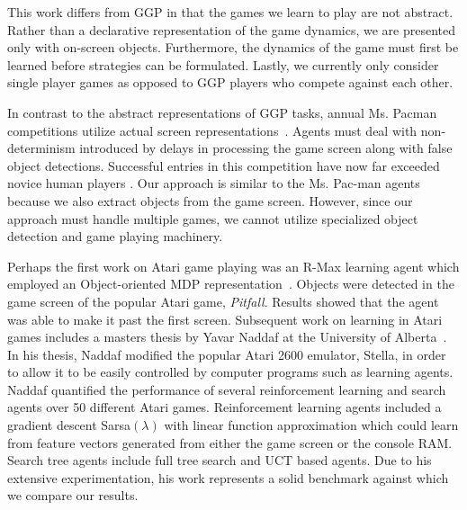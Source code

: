 \documentclass{acm_proc_article-sp}
\begin{document}
This work differs from GGP in that the games we learn to play are not abstract. Rather than a declarative representation of the game dynamics, we are presented only with on-screen objects. Furthermore, the dynamics of the game must first be learned before strategies can be formulated. Lastly, we currently only consider single player games as opposed to GGP players who compete against each other.

In contrast to the abstract representations of GGP tasks, annual Ms. Pacman competitions utilize actual screen representations~\cite{pacmancompetition}. Agents must deal with non-determinism introduced by delays in processing the game screen along with false object detections. Successful entries in this competition have now far exceeded novice human players \cite{sigevolution2007}. Our approach is similar to the Ms. Pac-man agents because we also extract objects from the game screen. However, since our approach must handle multiple games, we cannot utilize specialized object detection and game playing machinery.

Perhaps the first work on Atari game playing was an R-Max learning agent which employed an Object-oriented MDP representation~\cite{duik08}. Objects were detected in the game screen of the popular Atari game, \emph{Pitfall}. Results showed that the agent was able to make it past the first screen. Subsequent work on learning in Atari games includes a masters thesis by Yavar Naddaf at the University of Alberta~\cite{naddaf10}. In his thesis, Naddaf modified the popular Atari 2600 emulator, Stella, in order to allow it to be easily controlled by computer programs such as learning agents. Naddaf quantified the performance of several reinforcement learning and search agents over 50 different Atari games. Reinforcement learning agents included a gradient descent Sarsa$(\lambda)$ with linear function approximation which could learn from feature vectors generated from either the game screen or the console RAM. Search tree agents include full tree search and UCT based agents. Due to his extensive experimentation, his work represents a solid benchmark against which we compare our results.
\end{document}
